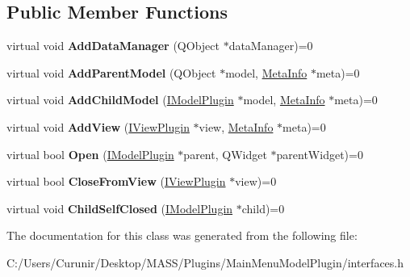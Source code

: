 \subsection*{Public Member Functions}
\begin{DoxyCompactItemize}
\item 
\mbox{\label{class_i_model_plugin_ab6612f3eaf63fcf66d61ca4522e6399a}} 
virtual void {\bfseries Add\+Data\+Manager} (Q\+Object $\ast$data\+Manager)=0
\item 
\mbox{\label{class_i_model_plugin_a984044bf0128b7fe19b2871a244ed030}} 
virtual void {\bfseries Add\+Parent\+Model} (Q\+Object $\ast$model, \hyperlink{struct_meta_info}{Meta\+Info} $\ast$meta)=0
\item 
\mbox{\label{class_i_model_plugin_a8427d2cff223c37abb0c4d856b244c4d}} 
virtual void {\bfseries Add\+Child\+Model} (\hyperlink{class_i_model_plugin}{I\+Model\+Plugin} $\ast$model, \hyperlink{struct_meta_info}{Meta\+Info} $\ast$meta)=0
\item 
\mbox{\label{class_i_model_plugin_aa209bc554d02bf3b04b64a7003a9ace4}} 
virtual void {\bfseries Add\+View} (\hyperlink{class_i_view_plugin}{I\+View\+Plugin} $\ast$view, \hyperlink{struct_meta_info}{Meta\+Info} $\ast$meta)=0
\item 
\mbox{\label{class_i_model_plugin_a1d0eb900e7bb460ab957ae90fd966d76}} 
virtual bool {\bfseries Open} (\hyperlink{class_i_model_plugin}{I\+Model\+Plugin} $\ast$parent, Q\+Widget $\ast$parent\+Widget)=0
\item 
\mbox{\label{class_i_model_plugin_ae6e9c6e8eb422b31d3a32c9c7bf60152}} 
virtual bool {\bfseries Close\+From\+View} (\hyperlink{class_i_view_plugin}{I\+View\+Plugin} $\ast$view)=0
\item 
\mbox{\label{class_i_model_plugin_a19a398057393941101d581b98db4bedf}} 
virtual void {\bfseries Child\+Self\+Closed} (\hyperlink{class_i_model_plugin}{I\+Model\+Plugin} $\ast$child)=0
\end{DoxyCompactItemize}


The documentation for this class was generated from the following file\+:\begin{DoxyCompactItemize}
\item 
C\+:/\+Users/\+Curunir/\+Desktop/\+M\+A\+S\+S/\+Plugins/\+Main\+Menu\+Model\+Plugin/interfaces.\+h\end{DoxyCompactItemize}
